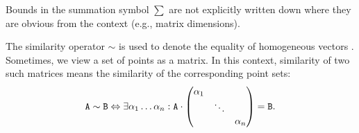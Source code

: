 Bounds in the summation symbol $\sum$ are not explicitly written down where they are obvious from the context (e.g., matrix dimensions).

\todo{$\diag$}

The similarity operator $\sim$ is used to denote the equality of homogeneous vectors \todo{\dots}.
Sometimes, we view a set of points \todo{\dots} as a matrix.
In this context, similarity of two such matrices means the similarity of the corresponding point sets:
\begin{equation}
\mathtt{A} \sim \mathtt{B} \Leftrightarrow \exists \alpha_1 \dots \alpha_n : \mathtt{A} \cdot \begin{pmatrix}
 \alpha_1 & & \\
  & \ddots & \\
 & & \alpha_n
 \end{pmatrix} = \mathtt{B}.
\end{equation}
